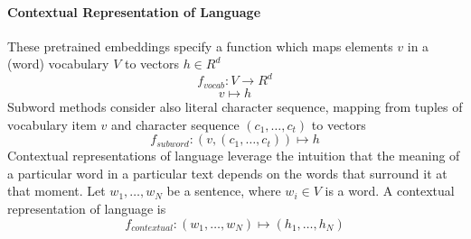 \documentclass[10pt]{report}
\begin{document}
\paragraph{Contextual Representation of Language} These pretrained embeddings specify a function which maps elements $v$ in a (word) vocabulary $V$ to vectors $h\in R^d$
$$f_{vocab} : V\rightarrow R^d$$
$$v\mapsto h$$
Subword methods consider also literal character sequence, mapping from tuples of vocabulary item $v$ and character sequence $(c_1,\ldots,c_t)$ to vectors
$$f_{subword} : (v, (c_1,\ldots,c_t))\mapsto h$$
Contextual representations of language leverage the intuition that the meaning of a particular word in a particular text depends on the words that surround it at that moment. Let $w_1,\ldots,w_N$ be a sentence, where $w_i\in V$ is a word. A contextual representation of language is 
$$f_{contextual} : (w_1,\ldots,w_N)\mapsto(h_1,\ldots,h_N)$$
\end{document}
